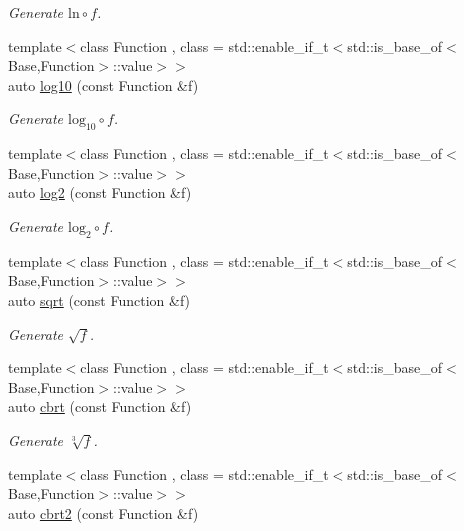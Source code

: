 \begin{DoxyCompactItemize}
\begin{DoxyCompactList}\small\item\em Generate $ \mathrm{ln}\circ f $. \end{DoxyCompactList}\item 
{\footnotesize template$<$class Function , class  = std\+::enable\+\_\+if\+\_\+t$<$std\+::is\+\_\+base\+\_\+of$<$\+Base,\+Function$>$\+::value$>$$>$ }\\auto \hyperlink{group__CMathGroup_gae9506f4e0e6fad4f756f636044697bfe}{log10} (const Function \&f)
\begin{DoxyCompactList}\small\item\em Generate $ \mathrm{log}_{10}\circ f $. \end{DoxyCompactList}\item 
{\footnotesize template$<$class Function , class  = std\+::enable\+\_\+if\+\_\+t$<$std\+::is\+\_\+base\+\_\+of$<$\+Base,\+Function$>$\+::value$>$$>$ }\\auto \hyperlink{group__CMathGroup_gacd6be7e9de7bbd54c852f0acf0c7d2c2}{log2} (const Function \&f)
\begin{DoxyCompactList}\small\item\em Generate $ \mathrm{log}_{2}\circ f $. \end{DoxyCompactList}\item 
{\footnotesize template$<$class Function , class  = std\+::enable\+\_\+if\+\_\+t$<$std\+::is\+\_\+base\+\_\+of$<$\+Base,\+Function$>$\+::value$>$$>$ }\\auto \hyperlink{group__CMathGroup_ga136c890475e48f88469a737d95368d05}{sqrt} (const Function \&f)
\begin{DoxyCompactList}\small\item\em Generate $ \sqrt{f} $. \end{DoxyCompactList}\item 
{\footnotesize template$<$class Function , class  = std\+::enable\+\_\+if\+\_\+t$<$std\+::is\+\_\+base\+\_\+of$<$\+Base,\+Function$>$\+::value$>$$>$ }\\auto \hyperlink{group__CMathGroup_gaa7f2552adfb8ec41aeb685adddd8bf98}{cbrt} (const Function \&f)
\begin{DoxyCompactList}\small\item\em Generate $ \sqrt[3]{f} $. \end{DoxyCompactList}\item 
{\footnotesize template$<$class Function , class  = std\+::enable\+\_\+if\+\_\+t$<$std\+::is\+\_\+base\+\_\+of$<$\+Base,\+Function$>$\+::value$>$$>$ }\\auto \hyperlink{group__CMathGroup_gafd27322fb64c6df3366f384c93819a06}{cbrt2} (const Function \&f)

\end{DoxyCompactItemize}
